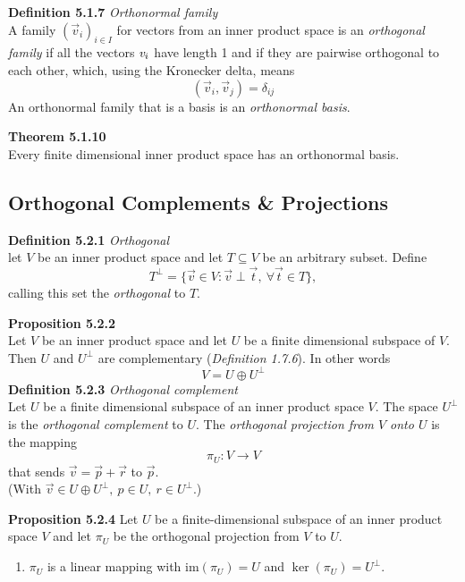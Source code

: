 \documentclass[8pt,landscape]{article}
\begin{document}
\begin{multicols}{3}
    \textbf{Definition 5.1.7} \emph{Orthonormal family} \\
    A family ${(\vec{v}_i)}_{i \in I}$ for vectors from an inner product space is an
    \emph{orthogonal family} if all the vectors $\emph{v}_i$ have length 1 and if they
    are pairwise orthogonal to each other, which, using the Kronecker delta, means
    \[
        (\vec{v}_i, \vec{v}_j) = \delta_{ij}
    \]
    An orthonormal family that is a basis is an \emph{orthonormal basis}.

    \textbf{Theorem 5.1.10} \\
    Every finite dimensional inner product space has an orthonormal basis.

    \subsection{Orthogonal Complements \& Projections}

    \textbf{Definition 5.2.1} \emph{Orthogonal} \\
    let $V$ be an inner product space and let $T \subseteq V$ be an arbitrary subset.
    Define
    \[
        T^\perp = \{\vec{v} \in V : \vec{v} \perp \vec{t}, \ \forall
        \vec{t} \in T \},
    \]
    calling this set the \emph{orthogonal} to $T$.

    \textbf{Proposition 5.2.2} \\
    Let $V$ be an inner product space and let $U$ be a finite dimensional subspace of $V$.
    Then $U$ and $U^\perp$ are complementary (\emph{Definition 1.7.6}).
    In other words
    \[
        V = U \oplus U^\perp
    \]
    \textbf{Definition 5.2.3} \emph{Orthogonal complement} \\
    Let $U$ be a finite dimensional subspace of an inner product space $V$.
    The space $U^\perp$ is the \emph{orthogonal complement} to $U$.
    The \emph{orthogonal projection from $V$ onto $U$} is the mapping
    \[
        \pi_U : V \to V
    \]
    that sends $\vec{v} = \vec{p} + \vec{r}$ to $\vec{p}$. \\
    (With $\vec{v} \in U \oplus U^\perp, \ p \in U, \ r \in U^\perp$.)

    \textbf{Proposition 5.2.4}
    Let $U$ be a finite-dimensional subspace of an inner product space $V$ and let
    $\pi_U$ be the orthogonal projection from $V$ to $U$.
    \begin{enumerate}
        \item $\pi_U$ is a linear mapping with $\mathrm{im} (\pi_U) = U$ and
            $\ker(\pi_U) = U^\perp$.


\end{enumerate}
\end{multicols}
\end{document}
